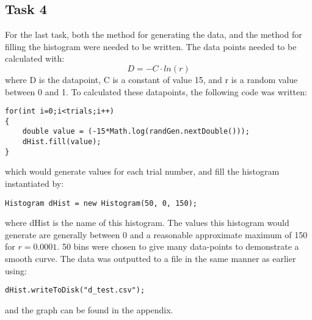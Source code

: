 \documentclass{article}
\begin{document}
\begin{multicols}{2}
\section{Task 4}
For the last task, both the method for generating the data, and the method for filling the histogram were needed to be written. The data points needed to be calculated with:
\begin{equation}
D = -C \cdot ln(r)
\end{equation}
where D is the datapoint, C is a constant of value 15, and r is a random value between 0 and 1. To calculated these datapoints, the following code was written:
\begin{lstlisting}
for(int i=0;i<trials;i++)  
{
	double value = (-15*Math.log(randGen.nextDouble()));
	dHist.fill(value);
}
\end{lstlisting}
which would generate values for each trial number, and fill the histogram instantiated by:
\begin{lstlisting}
Histogram dHist = new Histogram(50, 0, 150);
\end{lstlisting}
where dHist is the name of this histogram. The values this histogram would generate are generally between 0 and a reasonable approximate maximum of 150 for $r = 0.0001$. 50 bins were chosen to give many data-points to demonstrate a smooth curve. The data was outputted to a file in the same manner as earlier using:
\begin{lstlisting}
dHist.writeToDisk("d_test.csv");
\end{lstlisting}
and the graph can be found in the appendix.
\end{multicols}
\newpage
\end{document}
